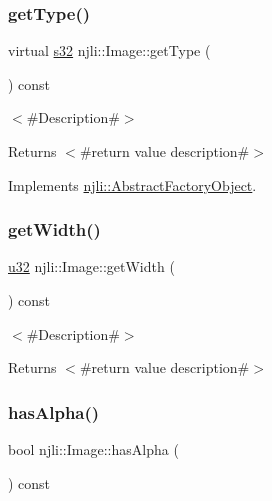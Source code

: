 \subsubsection{\texorpdfstring{get\+Type()}{getType()}}
{\footnotesize\ttfamily virtual \mbox{\hyperlink{_util_8h_aa62c75d314a0d1f37f79c4b73b2292e2}{s32}} njli\+::\+Image\+::get\+Type (\begin{DoxyParamCaption}{ }\end{DoxyParamCaption}) const\hspace{0.3cm}{\ttfamily [virtual]}}

$<$\#\+Description\#$>$

\begin{DoxyReturn}{Returns}
$<$\#return value description\#$>$ 
\end{DoxyReturn}


Implements \mbox{\hyperlink{classnjli_1_1_abstract_factory_object_a207c86146d40d0794708ae7f2d4e60a7}{njli\+::\+Abstract\+Factory\+Object}}.

\mbox{\label{classnjli_1_1_image_ad8861c346cef86545c02d0b7e86285b9}} 
\subsubsection{\texorpdfstring{get\+Width()}{getWidth()}}
{\footnotesize\ttfamily \mbox{\hyperlink{_util_8h_a10e94b422ef0c20dcdec20d31a1f5049}{u32}} njli\+::\+Image\+::get\+Width (\begin{DoxyParamCaption}{ }\end{DoxyParamCaption}) const}

$<$\#\+Description\#$>$

\begin{DoxyReturn}{Returns}
$<$\#return value description\#$>$ 
\end{DoxyReturn}
\mbox{\label{classnjli_1_1_image_a5bbc3edaead778489e987e0324744971}} 
\subsubsection{\texorpdfstring{has\+Alpha()}{hasAlpha()}}
{\footnotesize\ttfamily bool njli\+::\+Image\+::has\+Alpha (\begin{DoxyParamCaption}{ }\end{DoxyParamCaption}) const}

